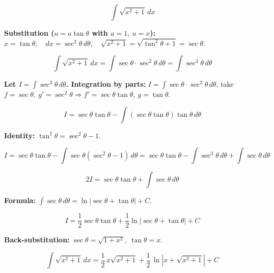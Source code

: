 \documentclass{article}
\begin{document}
\[
\int \sqrt{x^2+1}\,dx
\]

\textbf{Substitution ($u=a\tan\theta$ with $a=1,\ u=x$):} \quad $x=\tan\theta,\quad dx=\sec^2\theta\,d\theta,\quad \sqrt{x^2+1}=\sqrt{\tan^2\theta+1}=\sec\theta$.

\[
\int \sqrt{x^2+1}\,dx = \int \sec\theta \cdot \sec^2\theta\,d\theta = \int \sec^3\theta\,d\theta
\]

\textbf{Let $I = \int \sec^3\theta\,d\theta$. Integration by parts:} $\displaystyle I = \int \sec\theta \cdot \sec^2\theta\,d\theta$, take $f = \sec\theta,\ g' = \sec^2\theta \Rightarrow f' = \sec\theta\tan\theta,\ g = \tan\theta$.

\[
I = \sec\theta\tan\theta - \int (\sec\theta\tan\theta)\tan\theta\,d\theta
\]

\textbf{Identity:} $\tan^2\theta = \sec^2\theta - 1$.

\[
I = \sec\theta\tan\theta - \int \sec\theta(\sec^2\theta-1)\,d\theta
= \sec\theta\tan\theta - \int \sec^3\theta\,d\theta + \int \sec\theta\,d\theta
\]

\[
2I = \sec\theta\tan\theta + \int \sec\theta\,d\theta
\]

\textbf{Formula:} $\displaystyle \int \sec\theta\,d\theta = \ln|\sec\theta+\tan\theta| + C$.

\[
I = \frac{1}{2}\sec\theta\tan\theta + \frac{1}{2}\ln|\sec\theta+\tan\theta| + C
\]

\textbf{Back-substitution:} $\sec\theta = \sqrt{1+x^2},\ \tan\theta = x$.

\[
\boxed{
  \int \sqrt{x^2+1}\,dx = \frac{1}{2}\,x\sqrt{x^2+1} + \frac{1}{2}\,\ln\!\left|x+\sqrt{x^2+1}\right| + C
}
\]
\end{document}

